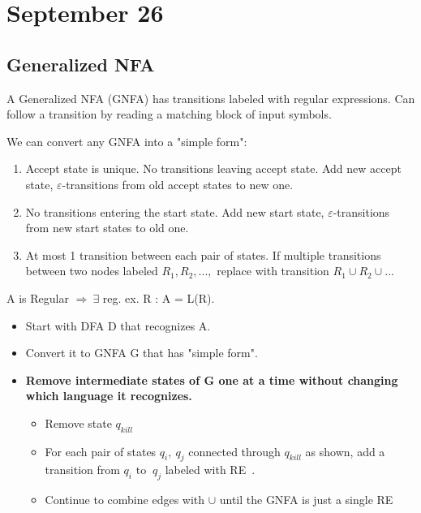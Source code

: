 \section{September 26}

\subsection{Generalized NFA} \label{sec:GNFA}
\begin{definition}
  A Generalized NFA (GNFA) has transitions labeled with regular expressions. Can follow a transition by reading a matching block of input symbols.
\end{definition}
We can convert any GNFA into a "simple form":
\begin{enumerate}
  \item Accept state is unique. No transitions leaving accept state. Add new accept state, $\varepsilon$-transitions from old accept states to new one.

  \item No transitions entering the start state. 
  Add new start state, $\varepsilon$-transitions from new start states to old one.
  
  \item At most 1 transition between each pair of states. If multiple transitions between two nodes labeled $R_1 , R_2 , ...,$ replace with transition $ R_1 \cup R_2 \cup ...$
\end{enumerate}
\begin{theorem}
  A is Regular $\Rightarrow \: \exists $ reg. ex. R : A = L(R).
\end{theorem}
\begin{itemize}
  \item Start with DFA D that recognizes A.
  \item Convert it to GNFA G that has "simple form".
  \item \bf Remove intermediate states of G one at a time without changing which language it recognizes. 
  \begin{itemize}
    \item Remove state $q_{kill}$
    \item For each pair of states $q_i , \: q_j $ connected through $q_{kill}$ as shown, add a transition from $q_i \text{ to } \: q_j $ labeled with RE~.
    \item Continue to combine edges with $\cup$ until the GNFA is just a single RE~
  \end{itemize}
\end{itemize}

